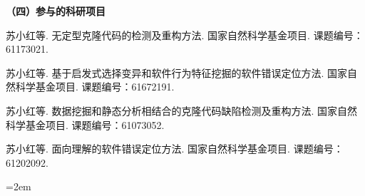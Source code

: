 \noindent\textbf{（四）参与的科研项目}
\begin{publist}
\item	
苏小红等. 无定型克隆代码的检测及重构方法. 国家自然科学基金项目. 课题编号：61173021.
\item 
苏小红等. 基于启发式选择变异和软件行为特征挖掘的软件错误定位方法. 国家自然科学基金项目. 课题编号：61672191.
\item
苏小红等. 数据挖掘和静态分析相结合的克隆代码缺陷检测及重构方法. 国家自然科学基金项目. 课题编号：61073052.
\item
苏小红等. 面向理解的软件错误定位方法. 国家自然科学基金项目. 课题编号：61202092.

\end{publist}
\vfill
{}\hangindent=2em\noindent

\setlength{\parindent}{2em}
